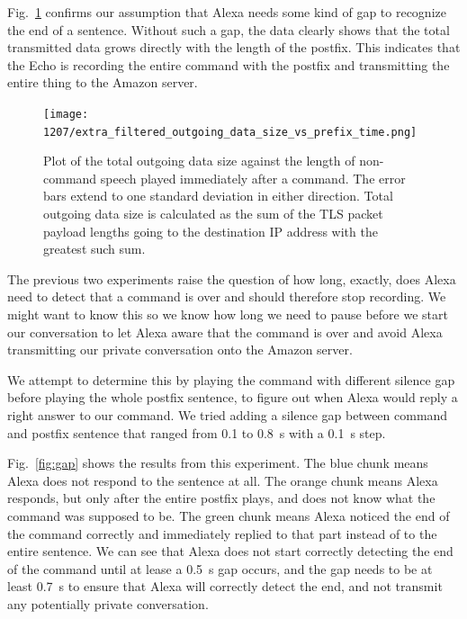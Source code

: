Fig.~\ref{fig:postfix_nogap} confirms our assumption that Alexa needs some kind of gap to recognize the end of a sentence. Without such a gap, the data clearly shows that the total transmitted data grows directly with the length of the postfix. This indicates that the Echo is recording the entire command with the postfix and transmitting the entire thing to the Amazon server.


\begin{figure}[!t]
    \centering
    \texttt{[image: 1207/extra\_filtered\_outgoing\_data\_size\_vs\_prefix\_time.png]}
    \caption{Plot of the total outgoing data size against the length of non-command speech played immediately after a command. The error bars extend to one standard deviation in either direction. Total outgoing data size is calculated as the sum of the TLS packet payload lengths going to the destination IP address with the greatest such sum.}
    \label{fig:postfix_nogap}
\end{figure}

The previous two experiments raise the question of how long, exactly, does Alexa need to detect that a command is over and should therefore stop recording. We might want to know this so we know how long we need to pause before we start our conversation to let Alexa aware that the command is over and avoid Alexa transmitting our private conversation onto the Amazon server.

We attempt to determine this by playing the command with different silence gap before playing the whole postfix sentence, to figure out when Alexa would reply a right answer to our command. We tried adding a silence gap between command and postfix sentence that ranged from 0.1 to 0.8~s with a 0.1~s step.

Fig.~\ref{fig:gap} shows the results from this experiment. The blue chunk means Alexa does not respond to the sentence at all. The orange chunk means Alexa responds, but only after the entire postfix plays, and does not know what the command was supposed to be. The green chunk means Alexa noticed the end of the command correctly and immediately replied to that part instead of to the entire sentence. We can see that Alexa does not start correctly detecting the end of the command until at lease a 0.5~s gap occurs, and the gap needs to be at least 0.7~s to ensure that Alexa will correctly detect the end, and not transmit any potentially private conversation.

